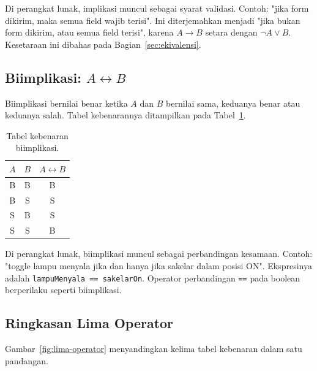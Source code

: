 \documentclass[11pt,a4paper]{article}
\begin{document}
Di perangkat lunak, implikasi muncul sebagai syarat validasi. Contoh: "jika form dikirim, maka semua field wajib terisi". Ini diterjemahkan menjadi "jika bukan form dikirim, atau semua field terisi", karena $A \to B$ setara dengan $\neg A \vee B$. Kesetaraan ini dibahas pada Bagian~\ref{sec:ekivalensi}.

\subsection{Biimplikasi: $A \leftrightarrow B$}

Biimplikasi bernilai benar ketika $A$ dan $B$ bernilai sama, keduanya benar atau keduanya salah. Tabel kebenarannya ditampilkan pada Tabel~\ref{tab:biimplikasi}.

\begin{table}[H]
	\centering
	\caption{Tabel kebenaran biimplikasi.}
	\label{tab:biimplikasi}
	\small
	\begin{tabular}{c c c}
		\toprule
		$A$ & $B$ & $A \leftrightarrow B$ \\
		\midrule
		B & B & B \\
		B & S & S \\
		S & B & S \\
		S & S & B \\
		\bottomrule
	\end{tabular}
\end{table}

Di perangkat lunak, biimplikasi muncul sebagai perbandingan kesamaan. Contoh: "toggle lampu menyala jika dan hanya jika sakelar dalam posisi ON". Ekspresinya adalah \texttt{lampuMenyala == sakelarOn}. Operator perbandingan \texttt{==} pada boolean berperilaku seperti biimplikasi.

\subsection{Ringkasan Lima Operator}

Gambar~\ref{fig:lima-operator} menyandingkan kelima tabel kebenaran dalam satu pandangan.
\end{document}
